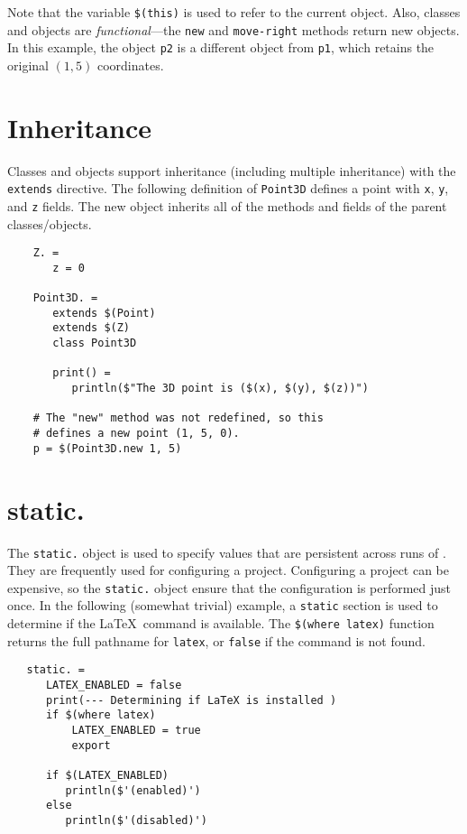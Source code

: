 Note that the variable \verb+$(this)+ is used to refer to the current object.  Also, classes and
objects are \emph{functional}---the \verb+new+ and \verb+move-right+ methods return new objects.  In
this example, the object \verb+p2+ is a different object from \verb+p1+, which retains the original
$(1, 5)$ coordinates.

\section{Inheritance}

Classes and objects support inheritance (including multiple inheritance) with the \verb+extends+
directive.  The following definition of \verb+Point3D+ defines a point with \verb+x+, \verb+y+, and
\verb+z+ fields.  The new object inherits all of the methods and fields of the parent classes/objects.

\begin{verbatim}
    Z. =
       z = 0

    Point3D. =
       extends $(Point)
       extends $(Z)
       class Point3D

       print() =
          println($"The 3D point is ($(x), $(y), $(z))")

    # The "new" method was not redefined, so this
    # defines a new point (1, 5, 0).
    p = $(Point3D.new 1, 5)
\end{verbatim}

\section{static.}
\label{section:static.}

The \verb+static.+ object is used to specify values that are persistent across runs of \OMake{}.  They
are frequently used for configuring a project.  Configuring a project can be expensive, so the
\verb+static.+ object ensure that the configuration is performed just once.  In the following
(somewhat trivial) example, a \verb+static+ section is used to determine if the \LaTeX\ command is
available.  The \verb+$(where latex)+ function returns the full pathname for \verb+latex+, or
\verb+false+ if the command is not found.

\begin{verbatim}
   static. =
      LATEX_ENABLED = false
      print(--- Determining if LaTeX is installed )
      if $(where latex)
          LATEX_ENABLED = true
          export

      if $(LATEX_ENABLED)
         println($'(enabled)')
      else
         println($'(disabled)')
\end{verbatim}

